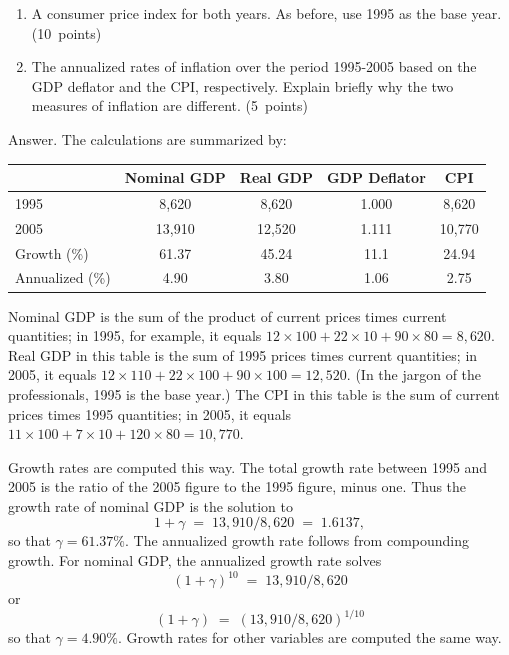 \documentclass[letterpaper,12pt]{article}
\begin{document}
\begin{enumerate}
\begin{enumerate}
\item A consumer price index for both years. 
As before, use 1995 as the base year.  (10~points)

\item The annualized rates of inflation over the period 1995-2005
based on the GDP deflator and the CPI, respectively.
Explain briefly why the two measures of inflation are different.  
(5~points)

\end{enumerate}


Answer.
The calculations are summarized by:
\begin{center}
\begin{tabular}{lcccc}
\hline\hline
         &  Nominal GDP  & Real GDP   &  GDP Deflator  & CPI \\
 \hline\hline
1995     &   8,620  & 8,620  &  1.000 &  8,620  \\
2005     &   13,910  &  12,520 & 1.111 & 10,770 \\
Growth (\%)  & 61.37  &  45.24  &  11.1  &  24.94  \\

Annualized (\%) & 4.90 & 3.80 & 1.06 & 2.75 \\
\hline\hline
\end{tabular}
\end{center}
Nominal GDP is the sum of the
product of current prices times current quantities; in 1995, for
example, it equals $12\times 100+22 \times 10+ 90\times 80 =
8,620$.  Real GDP in this table is the sum of 1995 prices times
current quantities; in 2005, it equals $12\times 110+22 \times
100+ 90\times 100 = 12,520$.  (In the jargon of the professionals,
1995 is the base year.) The CPI in this table is the sum of
current prices times 1995 quantities; in 2005, it equals 
$11\times 100+ 7\times 10+ 120\times 80 = 10,770$.


Growth rates are computed this way.  The total growth rate
between 1995 and 2005 is the ratio of the 2005 figure to the 1995
figure, minus one.  Thus the growth rate of nominal GDP is the
solution to
\[
    1 + \gamma \;=\; 13,910/8,620 \;=\; 1.6137 ,
\]
so that $\gamma = 61.37\%$.  The annualized growth rate follows
from compounding growth.  For nominal GDP, the
annualized growth rate solves
\[
    (1 + \gamma)^{10} \;=\; 13,910/8,620
\]
or
\[
    (1 + \gamma) \;=\; (13,910/8,620)^{1/10}
\]
so that $\gamma = 4.90\%$.  Growth rates for other variables are
computed the same way.



\end{enumerate}
\end{document}
